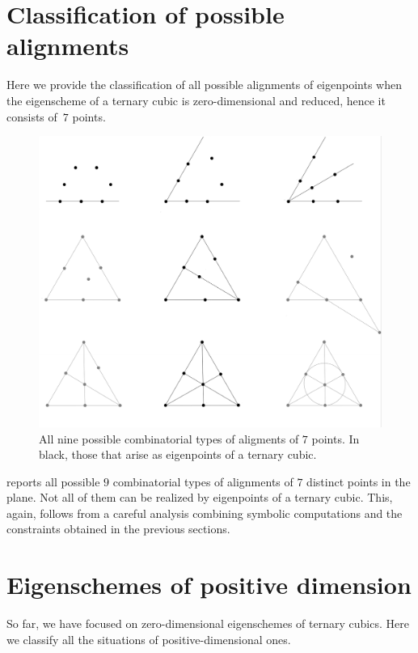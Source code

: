 \documentclass[11pt, a4paper, reqno, captions=tableheading,bibliography=totoc]{scrartcl}
\theoremstyle{plain}
\theoremstyle{definition}
\begin{document}
\section{Classification of possible alignments}
\label{alignments}

Here we provide the classification of all possible alignments of eigenpoints when the eigenscheme of a ternary cubic is zero-dimensional and reduced, hence it consists of~$7$ points.

\begin{figure}[H]
 \centering
 \includegraphics[trim={0.2cm 0 0.1cm 0}, width=\textwidth]{alignments}
 \caption{All nine possible combinatorial types of aligments of $7$ points. In black, those that arise as eigenpoints of a ternary cubic.}
 \label{figure:alignments}
\end{figure}


 reports all possible $9$ combinatorial types of alignments of $7$ distinct points in the plane. Not all of them can be realized by eigenpoints of a ternary cubic.
This, again, follows from a careful analysis combining symbolic computations and the constraints obtained in the previous sections.

\section{Eigenschemes of positive dimension}
\label{positive_dimensional}

So far, we have focused on zero-dimensional eigenschemes of ternary cubics.
Here we classify all the situations of positive-dimensional ones.
\end{document}
